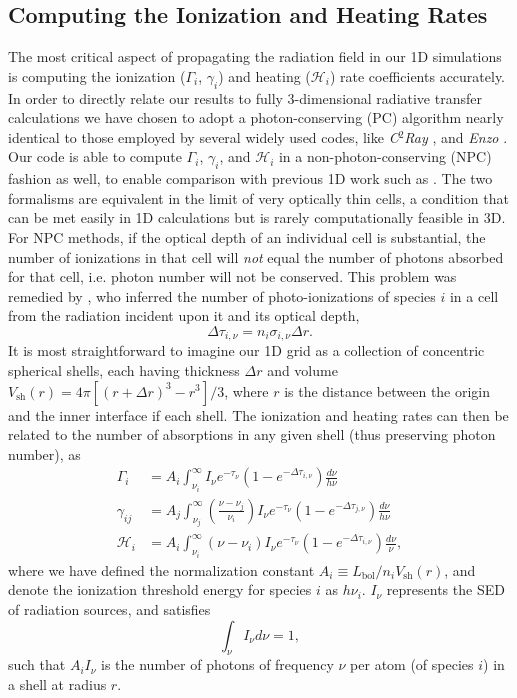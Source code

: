 \documentclass[letterpaper,titlepage,12pt]{article}
\numberwithin{equation}{section}
\newcommand{\Heat}{\mathcal{H}}
\newcommand{\sh}{\mathrm{sh}}
\begin{document}
\subsection{Computing the Ionization and Heating Rates}
The most critical aspect of propagating the radiation field in our 1D
simulations is computing the ionization ($\Gamma_i$, $\gamma_{i}$) and heating
($\Heat_i$) rate coefficients accurately. In order to directly relate our
results to fully 3-dimensional radiative transfer calculations we have chosen
to adopt a photon-conserving (PC) algorithm nearly identical to those employed
by several widely used codes, like \textit{C$^2$Ray} \citep{Mellema2006}, and
\textit{Enzo} \citep{Wise2011}. Our code is able to compute $\Gamma_i$,
$\gamma_{i}$, and $\Heat_i$ in a non-photon-conserving (NPC) fashion as well,
to enable comparison with previous 1D work such as \citet{Thomas2008}. The two
formalisms are equivalent in the limit of very optically thin cells, a
condition that can be met easily in 1D calculations but is rarely
computationally feasible in 3D. For NPC methods, if the optical depth of an
individual cell is substantial, the number of ionizations in that cell will
\textit{not} equal the number of photons absorbed for that cell, i.e. photon
number will not be conserved. This problem was remedied by \citet{Abel1999},
who inferred the number of photo-ionizations of species $i$ in a cell from the
radiation incident upon it and its optical depth,
\begin{equation}
    \Delta \tau_{i,\nu} = n_i \sigma_{i,\nu} \Delta r .
\end{equation}    
It is most straightforward to imagine our 1D grid as a collection of
concentric spherical shells, each having thickness $\Delta r$ and volume
$V_{\sh}(r) = 4 \pi [(r + \Delta r)^3 - r^3] / 3$, where $r$ is the distance
between the origin and the inner interface if each shell. The ionization and
heating rates can then be related to the number of absorptions in any given
shell (thus preserving photon number), as
\begin{align}
    \Gamma_i & = A_i \int_{\nu_i}^{\infty} I_{\nu} e^{-\tau_{\nu}} \left(1 - e^{-\Delta \tau_{i,\nu}}\right) \frac{d\nu}{h\nu} \label{eq:PhotoIonizationRate} \\
    \gamma_{ij} & = A_j \int_{\nu_j}^{\infty} \left(\frac{\nu - \nu_j}{\nu_i}\right) I_{\nu} e^{-\tau_{\nu}} \left(1 - e^{-\Delta \tau_{j,\nu}}\right) \frac{d\nu}{h\nu} \label{eq:SecondaryIonizationRate} \\
    \Heat_i & = A_i \int_{\nu_i}^{\infty} (\nu - \nu_i) I_{\nu} e^{-\tau_{\nu}} \left(1 - e^{-\Delta \tau_{i,\nu}}\right) \frac{d\nu}{\nu} , \label{eq:HeatingRate}
\end{align}    
where we have defined the normalization constant $A_i \equiv
L_{\mathrm{bol}}/n_i V_{\sh}(r)$, and denote the ionization threshold energy
for species $i$ as $h\nu_i$.  $I_{\nu}$ represents the SED of radiation sources, and satisfies 
\begin{equation}
\int_{\nu} I_{\nu} d\nu = 1,
\end{equation}
such that $A_i I_{\nu}$ is the number of photons of frequency $\nu$ per atom (of species $i$) in a shell at radius $r$.
\end{document}

